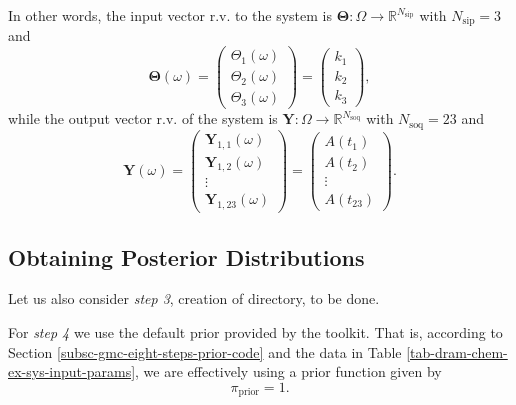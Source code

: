 In other words, the input vector r.v. to the system is $\boldsymbol{\Theta}:\Omega\rightarrow\mathbb{R}^{N_{\text{sip}}}$ with $N_{\text{sip}}=3$ and
\begin{equation*}
\boldsymbol{\Theta}(\omega)
= 
\left(
\begin{array}{c}
\Theta_1(\omega) \\
\Theta_2(\omega) \\
\Theta_3(\omega)
\end{array}
\right)
= 
\left(
\begin{array}{c}
k_1 \\
k_2 \\
k_3
\end{array}
\right),
\end{equation*}
while the output vector r.v. of the system is $\mathbf{Y}:\Omega\rightarrow\mathbb{R}^{N_{\text{soq}}}$ with $N_{\text{soq}}=23$ and
\begin{equation*}
\mathbf{Y}(\omega)
= 
\left(
\begin{array}{c}
\mathbf{Y}_{1,1}(\omega) \\
\mathbf{Y}_{1,2}(\omega) \\
\vdots                   \\
\mathbf{Y}_{1,23}(\omega)
\end{array}
\right)
= 
\left(
\begin{array}{c}
A(t_1) \\
A(t_2) \\
\vdots \\
A(t_23)
\end{array}
\right).
\end{equation*}

\clearpage
\subsection{Obtaining Posterior Distributions}

Let us also consider {\it step 3}, creation of directory, to be done.

For {\it step 4}
we use the default prior provided by the toolkit.
That is, according to Section \ref{subsc-gmc-eight-steps-prior-code}
and the data in Table \ref{tab-dram-chem-ex-sys-input-params}, we are effectively using a prior function given by
\begin{equation*}
\pi_{\text{prior}} = 1.
\end{equation*}

